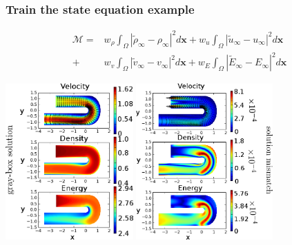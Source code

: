 \documentclass{beamer}
\begin{document}
\begin{frame}
    \frametitle{Train the state equation \hfill \scriptsize{example}} \small
    \scriptsize
    \vspace{-.2cm}
    \begin{equation*}\begin{split}
        \mathcal{M} = &w_\rho \int_\Omega \left|\tilde{\rho}_{\infty} - \rho_{\infty}\right|^2 d\boldsymbol{x}
                    + w_u
                    \int_\Omega \left|\tilde{u}_{\infty}- u_{\infty}\right|^2 d\boldsymbol{x} \\
                    + &w_v
                    \int_\Omega \left| \tilde{v}_{\infty}- v_{\infty}\right|^2 d\boldsymbol{x}
                    + w_E
                    \int_\Omega \left|\tilde{E}_{\infty} - E_\infty\right|^2 d\boldsymbol{x}
        \label{NS mismatch}
    \end{split}\end{equation*}
    \begin{center}
        \includegraphics[height=6cm]{graysol_Ubend.png}
        \includegraphics[height=6cm]{err_Ubend.png}
    \end{center}
\end{frame}
\end{document}
